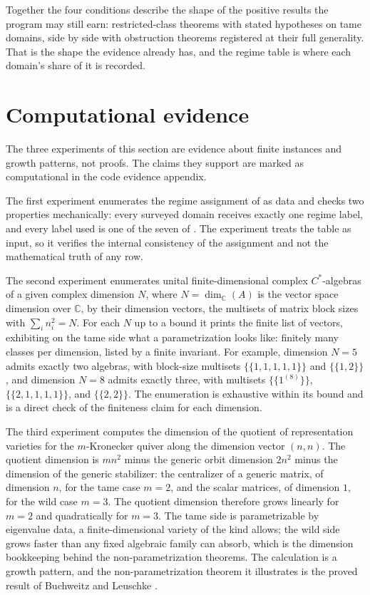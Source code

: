 \documentclass[11pt,letterpaper]{article}
\theoremstyle{definition}
\theoremstyle{remark}
\begin{document}
Together the four conditions describe the shape of the positive results the program may still earn: restricted-class theorems with stated hypotheses on tame domains, side by side with obstruction theorems registered at their full generality. That is the shape the evidence already has, and the regime table is where each domain's share of it is recorded.

\section{Computational evidence}
\label{sec:computational}

The three experiments of this section are evidence about finite instances and growth patterns, not proofs. The claims they support are marked as computational in the code evidence appendix.

The first experiment enumerates the regime assignment of  as data and checks two properties mechanically: every surveyed domain receives exactly one regime label, and every label used is one of the seven of . The experiment treats the table as input, so it verifies the internal consistency of the assignment and not the mathematical truth of any row.

The second experiment enumerates unital finite-dimensional complex $C^*$-algebras of a given complex dimension $N$, where $N = \dim_{\mathbb{C}}(A)$ is the vector space dimension over $\mathbb{C}$, by their dimension vectors, the multisets of matrix block sizes with $\sum_i n_i^2 = N$. For each $N$ up to a bound it prints the finite list of vectors, exhibiting on the tame side what a parametrization looks like: finitely many classes per dimension, listed by a finite invariant. For example, dimension $N = 5$ admits exactly two algebras, with block-size multisets $\{\!\{1,1,1,1,1\}\!\}$ and $\{\!\{1,2\}\!\}$, and dimension $N = 8$ admits exactly three, with multisets $\{\!\{1^{(8)}\}\!\}$, $\{\!\{2,1,1,1,1\}\!\}$, and $\{\!\{2,2\}\!\}$. The enumeration is exhaustive within its bound and is a direct check of the finiteness claim for each dimension.

The third experiment computes the dimension of the quotient of representation varieties for the $m$-Kronecker quiver along the dimension vector $(n, n)$. The quotient dimension is $m n^2$ minus the generic orbit dimension $2n^2$ minus the dimension of the generic stabilizer: the centralizer of a generic matrix, of dimension $n$, for the tame case $m = 2$, and the scalar matrices, of dimension $1$, for the wild case $m = 3$. The quotient dimension therefore grows linearly for $m = 2$ and quadratically for $m = 3$. The tame side is parametrizable by eigenvalue data, a finite-dimensional variety of the kind  allows; the wild side grows faster than any fixed algebraic family can absorb, which is the dimension bookkeeping behind the non-parametrization theorems. The calculation is a growth pattern, and the non-parametrization theorem it illustrates is the proved result of Buchweitz and Leuschke \cite{buchweitz2005}.
\end{document}
